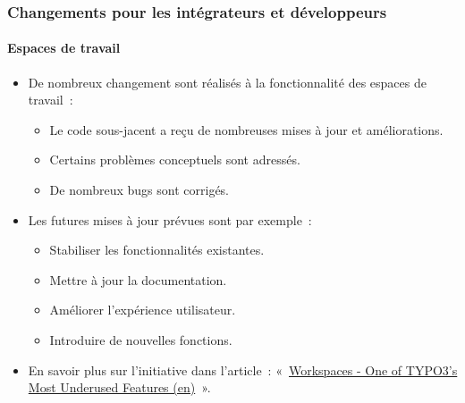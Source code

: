%

\begin{frame}[fragile]
	\frametitle{Changements pour les intégrateurs et développeurs}
	\framesubtitle{Espaces de travail}

	\begin{itemize}
		\item De nombreux changement sont réalisés à la fonctionnalité des espaces de travail~:

			\begin{itemize}
				\item Le code sous-jacent a reçu de nombreuses mises à jour et améliorations.
				\item Certains problèmes conceptuels sont adressés.
				\item De nombreux bugs sont corrigés.
			\end{itemize}

		\item Les futures mises à jour prévues sont par exemple~:

			\begin{itemize}
				\item Stabiliser les fonctionnalités existantes.
				\item Mettre à jour la documentation.
				\item Améliorer l'expérience utilisateur.
				\item Introduire de nouvelles fonctions.
			\end{itemize}

		\item En savoir plus sur l'initiative dans l'article~:\newline
			«~\href{https://typo3.org/article/workspaces-one-of-typo3s-most-underused-features}{Workspaces - One of TYPO3's Most Underused Features (en)}~».

	\end{itemize}

\end{frame}

